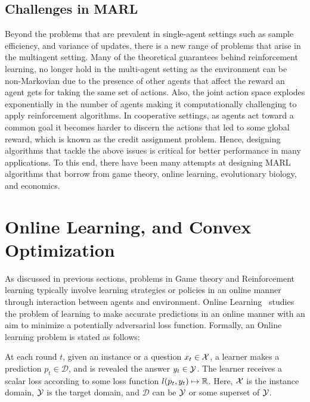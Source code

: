 \subsection{Challenges in MARL}
Beyond the problems that are prevalent in single-agent settings such as sample efficiency, and
variance of updates, there is a new range of problems that arise in the multiagent setting.
Many of the theoretical guarantees behind reinforcement learning, no longer hold in the multi-agent
setting as the environment can be non-Markovian due to the presence of other agents that affect the
reward an agent gets for taking the same set of actions.
Also, the joint action space explodes exponentially in the number of agents making it
computationally challenging to apply reinforcement algorithms.
In cooperative settings, as agents act toward a common goal it becomes harder to discern the
actions that led to some global reward, which is known as the credit assignment problem.
Hence, designing algorithms that tackle the above issues is critical for better performance in many
applications.
To this end, there have been many attempts at designing MARL algorithms that borrow from game
theory, online learning, evolutionary biology, and economics.

\section{Online Learning, and Convex Optimization}
As discussed in previous sections, problems in Game theory and Reinforcement learning typically
involve learning strategies or policies in an online manner through interaction between agents and
environment.
Online Learning~\cite{shalev-shwartzOnline2012} studies the problem of learning to make accurate
predictions in an online manner with an aim to minimize a potentially adversarial loss function.
Formally, an Online learning problem is stated as follows:

\begin{definition} 
	\label{def:olearning} 
	At each round $t$, given an instance or a question $x_t \in \mathcal{X}$, a learner makes a prediction $p_t \in \mathcal{D}$, 
	and is revealed the answer $y_t \in \mathcal{Y}$. The learner receives a scalar loss according to some loss function $l(p_t, y_t) \mapsto \mathbb{R}$. 
	Here, $\mathcal{X}$ is the instance domain, $\mathcal{Y}$ is the target domain, and $\mathcal{D}$ can be $\mathcal{Y}$ or some superset of $\mathcal{Y}$.
\end{definition}

